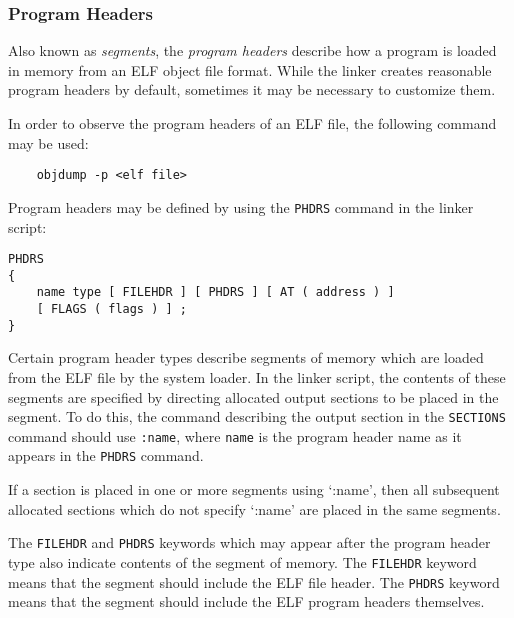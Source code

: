 \subsubsection{Program Headers}
Also known as \textit{segments}, the \textit{program headers} describe how a program is loaded in memory from an ELF object file format. While the linker creates reasonable program headers by default, sometimes it may be necessary to customize them.\cite{gnuldProgramHeaders}

In order to observe the program headers of an ELF file, the following command may be used:
\begin{verbatim}
    objdump -p <elf file>
\end{verbatim}

Program headers may be defined by using the \lstinline|PHDRS| command in the linker script:
\begin{verbatim}
PHDRS
{
    name type [ FILEHDR ] [ PHDRS ] [ AT ( address ) ]
    [ FLAGS ( flags ) ] ;
}
\end{verbatim}

Certain program header types describe segments of memory which are loaded from the ELF file by the system loader. In the linker script, the contents of these segments are specified by directing allocated output sections to be placed in the segment. To do this, the command describing the output section in the \lstinline|SECTIONS| command should use \lstinline|:name|, where \lstinline|name| is the program header name as it appears in the \lstinline|PHDRS| command.\cite{gnuldProgramHeaders}

If a section is placed in one or more segments using `:name', then all subsequent allocated sections which do not specify `:name' are placed in the same segments.\cite{gnuldProgramHeaders}

The \lstinline|FILEHDR| and \lstinline|PHDRS| keywords which may appear after the program header type also indicate contents of the segment of memory. The \lstinline|FILEHDR| keyword means that the segment should include the ELF file header. The \lstinline|PHDRS| keyword means that the segment should include the ELF program headers themselves.\cite{gnuldProgramHeaders}

